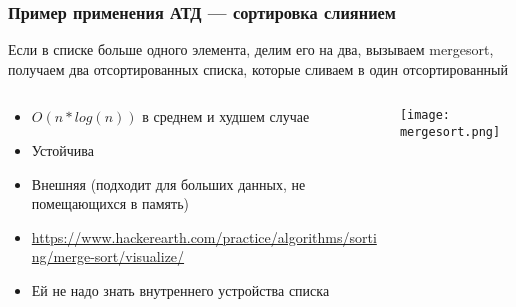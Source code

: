 \documentclass{../../slides-style}
\begin{document}
    \begin{frame}
        \frametitle{Пример применения АТД --- сортировка слиянием}
        Если в списке больше одного элемента, делим его на два, вызываем mergesort, получаем два отсортированных списка, которые сливаем в один отсортированный
        \begin{columns}
            \begin{column}{0.6\textwidth}
                \begin{itemize}
                    \item $O(n * log(n))$ в среднем и худшем случае
                    \item Устойчива
                    \item Внешняя (подходит для больших данных, не помещающихся в память)
                    \item \url{https://www.hackerearth.com/practice/algorithms/sorting/merge-sort/visualize/}
                    \item Ей не надо знать внутреннего устройства списка
                \end{itemize}
            \end{column}
            \begin{column}{0.4\textwidth}
                \begin{center}
                    \texttt{[image: mergesort.png]}
                \end{center}
            \end{column}
        \end{columns}
    \end{frame}
\end{document}

